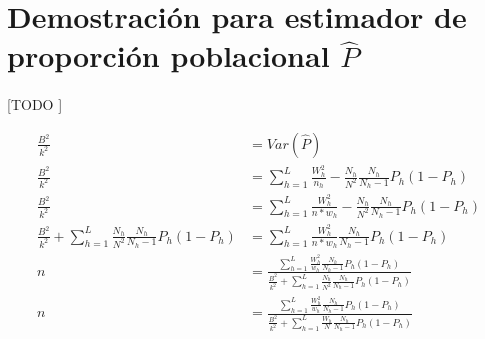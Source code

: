 \documentclass{article}
\begin{document}
  \section{Demostración para estimador de proporción poblacional $\widehat{P}$}
  \label{sec:dem2}

    \paragraph{}
    [TODO ]

    \begin{align}
      \frac{B^2}{k^2} &= Var(\widehat{P}) \\
      \frac{B^2}{k^2} &= \sum\limits_{h=1}^L\frac{W_h^2}{n_h} - \frac{N_h}{N^2}\frac{N_h}{N_h-1}P_h(1-P_h) \\
      \frac{B^2}{k^2} &= \sum\limits_{h=1}^L\frac{W_h^2}{n*w_h} - \frac{N_h}{N^2}\frac{N_h}{N_h-1}P_h(1-P_h) \\
      \frac{B^2}{k^2} + \sum\limits_{h=1}^L\frac{N_h}{N^2}\frac{N_h}{N_h-1}P_h(1-P_h) &= \sum\limits_{h=1}^L\frac{W_h^2}{n*w_h}\frac{N_h}{N_h-1}P_h(1-P_h) \\
      n &= \frac{
        \sum\limits_{h=1}^L\frac{W_h^2}{w_h}\frac{N_h}{N_h-1}P_h(1-P_h)
      }{
        \frac{B^2}{k^2} + \sum\limits_{h=1}^L\frac{N_h}{N^2}\frac{N_h}{N_h-1}P_h(1-P_h)
      } \\
      n &= \frac{
        \sum\limits_{h=1}^L\frac{W_h^2}{w_h}\frac{N_h}{N_h-1}P_h(1-P_h)
      }{\frac{B^2}{k^2} + \sum\limits_{h=1}^L\frac{W_h}{N}\frac{N_h}{N_h-1}P_h(1-P_h)
      } \\
    \end{align}




  \nocite{muest2017}
  \nocite{sarndal2003model}

  
  
\end{document}
